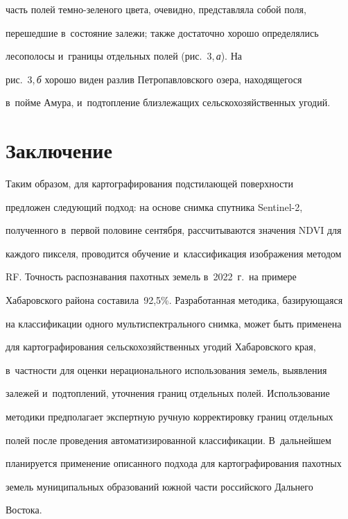 часть полей тем\-но-зе\-ле\-но\-го цвета, очевидно, представляла собой поля, 

перешедшие в~со\-сто\-яние залежи; также достаточно хорошо определялись 

лесополосы и~границы отдельных полей (рис.~3,\,\textit{а}). На 

рис.~3,\,\textit{б} хорошо виден разлив Петропавловского озера, находящегося 

в~пойме Амура, и~подтопление близлежащих сельскохозяйственных угодий.

  





\section{Заключение}





  Таким образом, для картографирования подстилающей поверхности 

предложен сле\-ду\-ющий подход: на основе снимка спутника Sentinel-2, 

полученного в~первой половине сентября, рассчитываются значения NDVI для 

каждого пикселя, проводится обучение и~классификация изображения методом 

RF. Точность распознавания пахотных земель в~2022~г.\ на примере 

Хабаровского района составила~92,5\%. Разработанная методика, базирующаяся 

на классификации одного мультиспектрального снимка, может быть применена 

для картографирования сельскохозяйственных угодий Хабаровского края, 

в~част\-ности для оценки нерационального использования земель, выявления 

залежей и~подтоплений, уточнения границ отдельных полей. Использование 

методики предполагает экспертную ручную корректировку границ отдельных 

полей после проведения автоматизированной классификации. В~дальнейшем 

планируется применение описанного подхода для картографирования пахотных 

земель муниципальных образований южной части российского Дальнего 

Востока.

